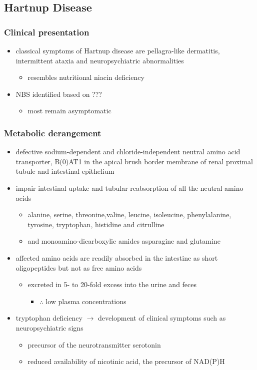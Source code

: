 \documentclass{scrartcl}
\begin{document}
\subsection{Hartnup Disease}
\label{sec:orga92649c}
\subsubsection{Clinical presentation}
\label{sec:orgca93dfc}
\begin{itemize}
\item classical symptoms of Hartnup disease are pellagra-like dermatitis,
intermittent ataxia and neuropsychiatric abnormalities
\begin{itemize}
\item resembles nutritional niacin deficiency
\end{itemize}
\item NBS identified based on ???
\begin{itemize}
\item most remain asymptomatic
\end{itemize}
\end{itemize}

\subsubsection{Metabolic derangement}
\label{sec:org68fc66f}
\begin{itemize}
\item defective sodium-dependent and chloride-independent neutral amino
acid transporter, B(0)AT1 in the apical brush border membrane of
renal proximal tubule and intestinal epithelium
\item impair intestinal uptake and tubular reabsorption of all the neutral
amino acids
\begin{itemize}
\item alanine, serine, threonine,valine, leucine, isoleucine,
phenylalanine, tyrosine, tryptophan, histidine and citrulline
\item and monoamino-dicarboxylic amides asparagine and glutamine
\end{itemize}
\item affected amino acids are readily absorbed in the intestine as short
oligopeptides but not as free amino acids
\begin{itemize}
\item excreted in 5- to 20-fold excess into the urine and feces
\begin{itemize}
\item \(\therefore\) low plasma concentrations
\end{itemize}
\end{itemize}
\item tryptophan deficiency \(\to\) development of clinical symptoms such as
neuropsychiatric signs
\begin{itemize}
\item precursor of the neurotransmitter serotonin
\item reduced availability of nicotinic acid, the precursor of NAD(P)H
\end{itemize}
\end{itemize}
\end{document}
